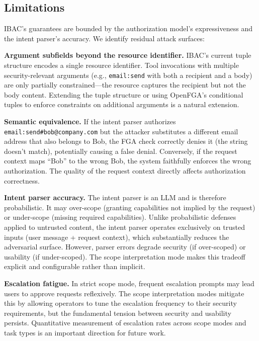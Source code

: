 \documentclass[11pt]{article}
\begin{document}
\subsection{Limitations}

IBAC's guarantees are bounded by the authorization model's expressiveness and the intent parser's accuracy. We identify residual attack surfaces:

\textbf{Argument subfields beyond the resource identifier.} IBAC's current tuple structure encodes a single resource identifier. Tool invocations with multiple security-relevant arguments (e.g., \texttt{email:send} with both a recipient and a body) are only partially constrained---the resource captures the recipient but not the body content. Extending the tuple structure or using OpenFGA's conditional tuples to enforce constraints on additional arguments is a natural extension.

\textbf{Semantic equivalence.} If the intent parser authorizes \texttt{email:send\#bob@company.com} but the attacker substitutes a different email address that also belongs to Bob, the FGA check correctly denies it (the string doesn't match), potentially causing a false denial. Conversely, if the request context maps ``Bob'' to the wrong Bob, the system faithfully enforces the wrong authorization. The quality of the request context directly affects authorization correctness.

\textbf{Intent parser accuracy.} The intent parser is an LLM and is therefore probabilistic. It may over-scope (granting capabilities not implied by the request) or under-scope (missing required capabilities). Unlike probabilistic defenses applied to untrusted content, the intent parser operates exclusively on trusted inputs (user message + request context), which substantially reduces the adversarial surface. However, parser errors degrade security (if over-scoped) or usability (if under-scoped). The scope interpretation mode makes this tradeoff explicit and configurable rather than implicit.

\textbf{Escalation fatigue.} In strict scope mode, frequent escalation prompts may lead users to approve requests reflexively. The scope interpretation modes mitigate this by allowing operators to tune the escalation frequency to their security requirements, but the fundamental tension between security and usability persists. Quantitative measurement of escalation rates across scope modes and task types is an important direction for future work.

\end{document}
